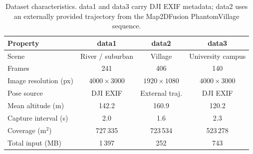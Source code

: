\begin{table}[t]
\centering
\caption{Dataset characteristics.  data1 and data3 carry DJI EXIF metadata;
         data2 uses an externally provided trajectory from the
         Map2DFusion PhantomVillage sequence.}
\label{tab:datasets}
\begin{tabular}{lccc}
\toprule
Property               & data1        & data2        & data3        \\
\midrule
Scene                  & River / suburban & Village      & University campus \\
Frames                 & 241          & 406          & 140          \\
Image resolution (px)  & $4000\!\times\!3000$ & $1920\!\times\!1080$ & $4000\!\times\!3000$ \\
Pose source            & DJI EXIF     & External traj.  & DJI EXIF     \\
Mean altitude (m)      & 142.2        & 160.9        & 120.2        \\
Capture interval (s)   & 2.0          & 1.6          & 2.3          \\
Coverage (m$^{2}$)     & 727\,335     & 723\,534     & 523\,278     \\
Total input (MB)       & 1\,397       & 252          & 743          \\
\bottomrule
\end{tabular}
\end{table}

